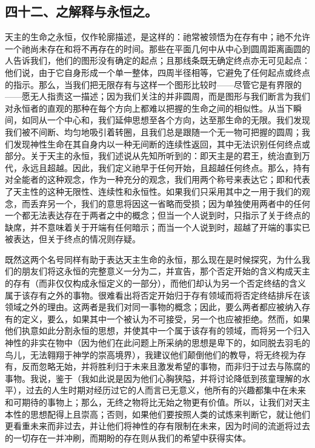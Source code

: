 
\subsection{四十二、之解释与永恒之。}

天主的生命之永恒，仅作轮廓描述，是这样的：祂常被领悟为在存有中；祂不允许一个祂尚未存在和将不再存在的时间。那些在平面几何中从中心到圆周距离画圆的人告诉我们，他们的图形没有确定的起点；且那线条既无确定终点亦无可见起点：他们说，由于它自身形成一个单一整体，四周半径相等，它避免了任何起点或终点的指示。那么，当我们把无限存有与这样一个图形比较时——尽管它是有界限的——愿无人指责这一描述；因为我们关注的并非圆周，而是图形与我们断言为我们对永恒者的直观的那种在每个方向上都难以把握的生命之间的相似性。从当下瞬间，如同从一个中心和，我们延伸思想至各个方向，达至那生命的无限。我们发现我们被不间断、均匀地吸引着转圈，且我们总是跟随一个无一物可把握的圆周；我们发现神性生命在其自身内以一种无间断的连续性返回，其中无法识别任何终点或部分。关于天主的永恒，我们述说从先知所听到的：即天主是的君王，统治直到万代，永远且超越。因此，我们定义祂早于任何开始，且超越任何终点。那么，持有对全能者的这种观念，作为一种充分的观念，我们用两个称号来表达它；即和代表了天主性的这种无限性、连续性和永恒性。如果我们只采用其中之一用于我们的观念，而丢弃另一个，我们的意思将因这一省略而受损；因为单独使用两者中的任何一个都无法表达存在于两者之中的概念；但当一个人说到时，只指示了关于终点的缺席，并不意味着关于开端有任何暗示；而当一个人说到时，超越了开端的事实已被表达，但关于终点的情况则存疑。\par

既然这两个名号同样有助于表达天主生命的永恒，那么现在是时候探究，为什么我们的朋友们将这永恒的完整意义一分为二，并宣告，那个否定开始的含义构成天主的存有（而非仅仅构成永恒定义的一部分），而他们却认为另一个否定终结的含义属于该存有之外的事物。很难看出将否定开始归于存有领域而将否定终结排斥在该领域之外的理由。这两者是我们对同一事物的概念；因此，要么两者都应被纳入存有的定义，要么，如果其中一个被认为不可接受，另一个也应被拒绝。然而，如果他们执意如此分割永恒的思想，并使其中一个属于该存有的领域，而将另一个归入神性的非实在物中（因为他们在此问题上所采纳的思想是卑下的，如同脱去羽毛的鸟儿，无法翱翔于神学的崇高境界），我建议他们颠倒他们的教导，将无终视为存有，反而忽略无始，并将胜利归于未来且激发希望的事物，而非归于过去与陈腐的事物。我说，鉴于（我如此说是因为他们心胸狭隘，并将讨论降低到孩童理解的水平），过去的人生时期对经历过它的人而言已无意义，他所有的兴趣都集中在未来和可期待的事物上；那么，无终之物将比无始之物更有价值。所以，让我们对天主本性的思想配得上且崇高；否则，如果他们要按照人类的试炼来判断它，就让他们更看重未来而非过去，并让他们将神性的存有限制在未来，因为时间的流逝将过去的一切存在一并冲刷，而期盼的存在则从我们的希望中获得实体。\par

